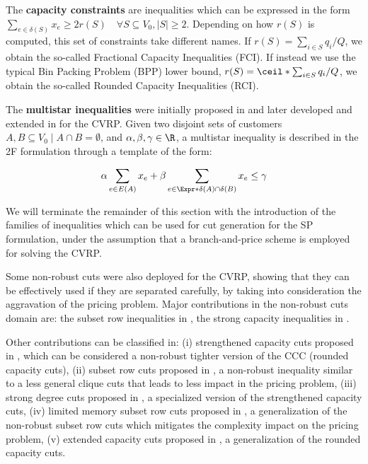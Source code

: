 The \textbf{capacity constraints} are inequalities which can be expressed in the form
$\sum_{e \in \delta(S)} x_e \ge 2 r(S) \quad \forall S \subseteq V_0, |S| \ge 2$.
Depending on how $r(S)$ is computed, this set of constraints take different names.
If $r(S) = \sum_{i \in S} q_i / Q$, we obtain the so-called Fractional Capacity Inequalities (FCI).
If instead we use the typical Bin Packing Problem (BPP) lower bound, $r(S) = \ceil*{\sum_{i \in S} q_i / Q}$, we obtain the so-called Rounded Capacity Inequalities (RCI).


The \textbf{multistar inequalities} were initially proposed in \textcite{araque1990, gouveia1995}
and later developed and extended in \textcite{letchford2002} for the CVRP.
Given two disjoint sets of customers $A, B \subseteq V_0 \mid A \cap B = \emptyset$,
and $\alpha, \beta, \gamma \in \R$,
a multistar inequality is described in the 2F formulation through a
template of the form:

\begin{equation}
    \alpha \sum_{e \in E(A)} x_e + \beta \sum_{e \in \Expr*{\delta(A) \cap \delta(B)}} x_e \le \gamma
\end{equation}


\medskip


We will terminate the remainder of this section with the introduction
of the families of inequalities which can be used for cut generation
for the SP formulation, under the assumption that a branch-and-price scheme is employed
for solving the CVRP.

Some non-robust cuts were also deployed for the CVRP,
showing that they can be effectively used if they are separated
carefully, by taking into consideration the aggravation of the pricing problem.
Major contributions in the non-robust cuts domain are: the subset row inequalities in \textcite{jepsen2008a},
the strong capacity inequalities in \textcite{baldacci2008}.


Other contributions can be classified in:
(i) strengthened capacity cuts proposed in \textcite{baldacci2008}, which can be considered a
non-robust tighter version of the CCC (rounded capacity cuts),
(ii) subset row cuts proposed in \textcite{jepsen2008a}, a non-robust
inequality similar to a less general clique cuts that leads to less impact in the pricing problem,
(iii) strong degree cuts proposed in \textcite{contardo2011}, a specialized version
of the strengthened capacity cuts,
(iv) limited memory subset row cuts proposed in \textcite{pecin2017}, a generalization
of the non-robust subset row cuts which mitigates the complexity impact on the pricing problem,
(v) extended capacity cuts proposed in \textcite{pessoa2008a, pessoa2009}, a
generalization of the rounded capacity cuts.


